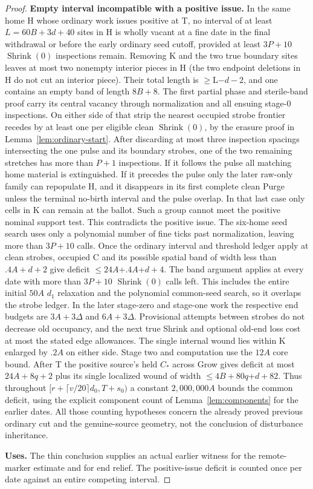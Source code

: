 \begin{proof}
\textbf{Empty interval incompatible with a positive issue.} In the same home H whose ordinary work issues positive at T, no interval of at least \(L=60B+3d+40\) sites in H is wholly vacant at a fine date in the final withdrawal or before the early ordinary seed cutoff, provided at least \(3P+10\) \(\operatorname{Shrink}(0)\) inspections remain. Removing K and the two true boundary sites leaves at most two nonempty interior pieces in H (the two endpoint deletions in H do not cut an interior piece). Their total length is \(\ge\)L\(-\)\(d- 2\), and one contains an empty band of length \(8B+8\). The first partial phase and sterile-band proof carry its central vacancy through normalization and all ensuing stage-0 inspections. On either side of that strip the nearest occupied strobe frontier recedes by at least one per eligible clean \(\operatorname{Shrink}(0)\), by the erasure proof in Lemma~\ref{lem:ordinary-start}. After discarding at most three inspection spacings intersecting the one pulse and its boundary strobes, one of the two remaining stretches has more than \(P+1\) inspections. If it follows the pulse all matching home material is extinguished. If it precedes the pulse only the later raw-only family can repopulate H, and it disappears in its first complete clean Purge unless the terminal no-birth interval and the pulse overlap. In that last case only cells in K can remain at the ballot. Such a group cannot meet the positive nominal support test. This contradicts the positive issue. The six-home seed search uses only a polynomial number of fine ticks past normalization, leaving more than \(3P+10\) calls. Once the ordinary interval and threshold ledger apply at clean strobes, occupied C and its possible spatial band of width less than \(.4A+d+2\) give deficit \(\le\)\(24A\)+.\(4A\)+\(d+4\). The band argument applies at every date with more than \(3P+10\) \(\operatorname{Shrink}(0)\) calls left. This includes the entire initial \(50A\) \(d_1\) relaxation and the polynomial common-seed search, so it overlaps the strobe ledger. In the later stage-zero and stage-one work the respective end budgets are \(3A+3\Delta \) and \(6A+3\Delta \). Provisional attempts between strobes do not decrease old occupancy, and the next true Shrink and optional old-end loss cost at most the stated edge allowances. The single internal wound lies within K enlarged by \(.2A\) on either side. Stage two and computation use the \(12A\) core bound. After T the positive source's held \(C_*\) across Grow gives deficit at most \(24A+8q+2\) plus its single localized wound of width \(\le\)\(4B+80q\)+\(d+82\). Thus throughout \([r+\lceil v/20 \rceil d_0,T+s_0)\) a constant \(2,000,000A\) bounds the common deficit, using the explicit component count of Lemma~\ref{lem:components} for the earlier dates. All those counting hypotheses concern the already proved previous ordinary cut and the genuine-source geometry, not the conclusion of disturbance inheritance.

\textbf{Uses.} The thin conclusion supplies an actual earlier witness for the remote-marker estimate and for end relief. The positive-issue deficit is counted once per date against an entire competing interval.
\end{proof}

